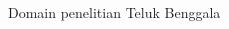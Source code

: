 \begin{spacing}{1.5}
\begin{enumerate}
\begin{itemize}
\begin{figure}[H]
				\caption{Domain penelitian Teluk Benggala}
			\end{figure}
		\end{itemize}
	\end{enumerate}
\end{spacing}